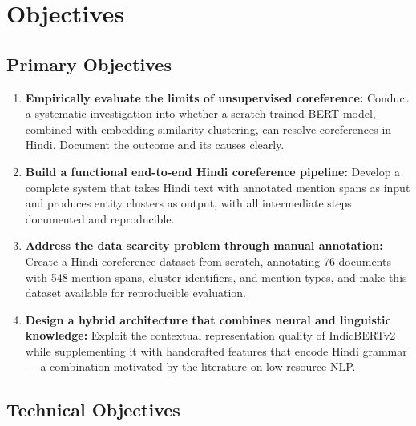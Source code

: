 \documentclass[12pt,a4paper]{report}
\begin{document}
\section{Objectives}

\subsection{Primary Objectives}

\begin{enumerate}
    \item \textbf{Empirically evaluate the limits of unsupervised coreference:} Conduct a systematic investigation into whether a scratch-trained BERT model, combined with embedding similarity clustering, can resolve coreferences in Hindi. Document the outcome and its causes clearly.

    \item \textbf{Build a functional end-to-end Hindi coreference pipeline:} Develop a complete system that takes Hindi text with annotated mention spans as input and produces entity clusters as output, with all intermediate steps documented and reproducible.

    \item \textbf{Address the data scarcity problem through manual annotation:} Create a Hindi coreference dataset from scratch, annotating 76 documents with 548 mention spans, cluster identifiers, and mention types, and make this dataset available for reproducible evaluation.

    \item \textbf{Design a hybrid architecture that combines neural and linguistic knowledge:} Exploit the contextual representation quality of IndicBERTv2 while supplementing it with handcrafted features that encode Hindi grammar --- a combination motivated by the literature on low-resource NLP.
\end{enumerate}

\subsection{Technical Objectives}
\end{document}
